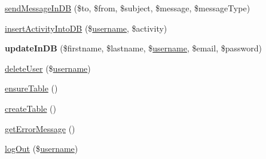 \begin{DoxyCompactItemize}
\hyperlink{classdb_validator_a203aedcf96613e8ad2cb6273bf664263}{send\-Message\-In\-D\-B} (\$to, \$from, \$subject, \$message, \$message\-Type)
\item 
\hyperlink{classdb_validator_a4559213abe578337a820686417a80e4a}{insert\-Activity\-Into\-D\-B} (\$\hyperlink{classdb_validator_a7475524fbb2e38dd6c9f7a6661b0bb81}{username}, \$activity)
\item 
\hypertarget{classdb_validator_a713bfc19a744a797703086cd9129ab97}{{\bfseries update\-In\-D\-B} (\$firstname, \$lastname, \$\hyperlink{classdb_validator_a7475524fbb2e38dd6c9f7a6661b0bb81}{username}, \$email, \$password)}\label{classdb_validator_a713bfc19a744a797703086cd9129ab97}

\item 
\hyperlink{classdb_validator_a59ad157d090400bd74195d538e8655d7}{delete\-User} (\$\hyperlink{classdb_validator_a7475524fbb2e38dd6c9f7a6661b0bb81}{username})
\item 
\hyperlink{classdb_validator_af4f0dc1bf02a2f431848c6a39407a29d}{ensure\-Table} ()
\item 
\hyperlink{classdb_validator_ad3d7cd058f1bf894920970b2d69098d1}{create\-Table} ()
\item 
\hyperlink{classdb_validator_a3d24ed0e93b212b4d5e382fa795bf4ef}{get\-Error\-Message} ()
\item 
\hyperlink{classdb_validator_a7bd718e89060488236778f8a6663d1dd}{log\-Out} (\$\hyperlink{classdb_validator_a7475524fbb2e38dd6c9f7a6661b0bb81}{username})
\end{DoxyCompactItemize}
